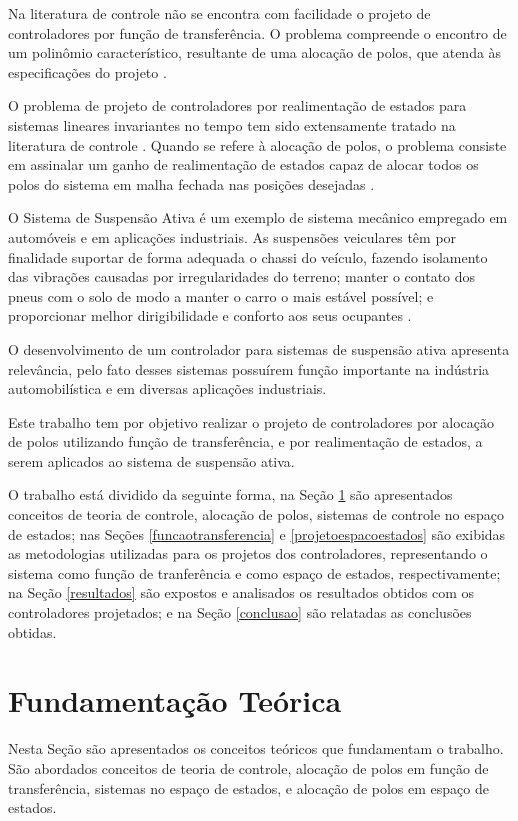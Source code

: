 \documentclass[journal,brazil,english]{IEEEtran}
\begin{document}
Na literatura de controle não se encontra com facilidade o projeto de controladores por função de transferência. O problema compreende o encontro de um polinômio característico, resultante de uma alocação de polos, que atenda às especificações do projeto \cite{lordelo}.

O problema de projeto de controladores por realimentação de estados para sistemas lineares invariantes no tempo tem sido extensamente tratado na literatura de controle \cite{ogata, nise, dorf}. Quando se refere à alocação de polos, o problema consiste em assinalar um ganho de realimentação de estados capaz de alocar todos os polos do sistema em malha fechada nas posições desejadas \cite{ogata}.

O Sistema de Suspensão Ativa é um exemplo de sistema mecânico empregado em automóveis e em aplicações industriais. As suspensões veiculares têm por finalidade suportar de forma adequada o chassi do veículo, fazendo isolamento das vibrações causadas por irregularidades do terreno; manter o contato dos pneus com o solo de modo a manter o carro o mais estável possível; e proporcionar melhor dirigibilidade e conforto aos seus ocupantes \cite{corte-real}.

O desenvolvimento de um controlador para sistemas de suspensão ativa apresenta relevância, pelo fato desses sistemas possuírem função importante na indústria automobilística e em diversas aplicações industriais.

Este trabalho tem por objetivo realizar o projeto de controladores por alocação de polos utilizando função de transferência, e por realimentação de estados, a serem aplicados ao sistema de suspensão ativa.

O trabalho está dividido da seguinte forma, na Seção \ref{fundamentacao} são apresentados conceitos de teoria de controle, alocação de polos, sistemas de controle no espaço de estados; nas Seções \ref{funcaotransferencia} e \ref{projetoespacoestados} são exibidas as metodologias utilizadas para os projetos dos controladores, representando o sistema como função de tranferência e como espaço de estados, respectivamente; na Seção \ref{resultados} são expostos e analisados os resultados obtidos com os controladores projetados; e na Seção \ref{conclusao} são relatadas as conclusões obtidas.

\section{Fundamentação Teórica}\label{fundamentacao}
Nesta Seção são apresentados os conceitos teóricos que fundamentam o trabalho. São abordados conceitos de teoria de controle, alocação de polos em função de transferência, sistemas no espaço de estados, e alocação de polos em espaço de estados.
\end{document}
